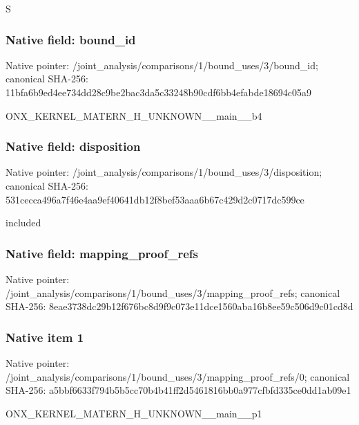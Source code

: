 \documentclass[10pt,a4paper]{article}
\begin{document}
\begingroup\raggedright\sloppy S\par\endgroup

\subsubsection{Native field: bound\_\allowbreak{}id}
Native pointer: /joint\_\allowbreak{}analysis/comparisons/1/bound\_\allowbreak{}uses/3/bound\_\allowbreak{}id; canonical SHA-256: 11bfa6b9ed4ee734dd28c9be2bac3da5c33248b90cdf6bb4efabde18694c05a9

\begingroup\raggedright\sloppy ONX\_\allowbreak{}KERNEL\_\allowbreak{}MATERN\_\allowbreak{}H\_\allowbreak{}UNKNOWN\_\allowbreak{}\_\allowbreak{}main\_\allowbreak{}\_\allowbreak{}b4\par\endgroup

\subsubsection{Native field: disposition}
Native pointer: /joint\_\allowbreak{}analysis/comparisons/1/bound\_\allowbreak{}uses/3/disposition; canonical SHA-256: 531cecca496a7f46e4aa9ef40641db12f8bef53aaa6b67c429d2c0717dc599ce

\begingroup\raggedright\sloppy included\par\endgroup

\subsubsection{Native field: mapping\_\allowbreak{}proof\_\allowbreak{}refs}
Native pointer: /joint\_\allowbreak{}analysis/comparisons/1/bound\_\allowbreak{}uses/3/mapping\_\allowbreak{}proof\_\allowbreak{}refs; canonical SHA-256: 8eae3738dc29b12f676bc8d9f9c073e11dce1560aba16b8ee59c506d9c01cd8d

\subsubsection{Native item 1}
Native pointer: /joint\_\allowbreak{}analysis/comparisons/1/bound\_\allowbreak{}uses/3/mapping\_\allowbreak{}proof\_\allowbreak{}refs/0; canonical SHA-256: a5bbf6633f794b5b5cc70b4b41ff2d5461816bb0a977cfbfd335ce0dd1ab09e1

\begingroup\raggedright\sloppy ONX\_\allowbreak{}KERNEL\_\allowbreak{}MATERN\_\allowbreak{}H\_\allowbreak{}UNKNOWN\_\allowbreak{}\_\allowbreak{}main\_\allowbreak{}\_\allowbreak{}p1\par\endgroup
\end{document}
